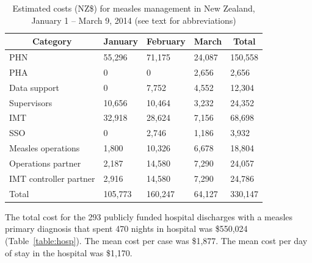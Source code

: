 \documentclass{article}
\begin{document}
\begin{table}
\caption{Estimated costs (NZ\$) for measles management in New Zealand, January 1 -- March 9, 2014 (see text for abbreviations)}
\begin{center}
\begin{tabular}{lllll}
\hline\hline
\multicolumn{1}{c}{Category}&\multicolumn{1}{c}{January}&\multicolumn{1}{c}{February}&\multicolumn{1}{c}{March}&\multicolumn{1}{c}{Total}\tabularnewline
\hline
PHN&55,296&71,175&24,087&150,558\tabularnewline
PHA&0&0&2,656&2,656\tabularnewline
Data support&0&7,752&4,552&12,304\tabularnewline
Supervisors&10,656&10,464&3,232&24,352\tabularnewline
IMT&32,918&28,624&7,156&68,698\tabularnewline
SSO&0&2,746&1,186&3,932\tabularnewline
Measles operations&1,800&10,326&6,678&18,804\tabularnewline
Operations partner&2,187&14,580&7,290&24,057\tabularnewline
IMT controller partner&2,916&14,580&7,290&24,786\tabularnewline
Total&105,773&160,247&64,127&330,147\tabularnewline
\hline
\end{tabular}\end{center}\label{table:direct}
\end{table}

The total cost for the 293 publicly funded hospital discharges with a measles primary diagnosis that spent 470 nights in hospital was \$550,024 (Table~\ref{table:hosp}). The mean cost per case was \$1,877. The mean cost per day of stay in the hospital was \$1,170.
\end{document}
